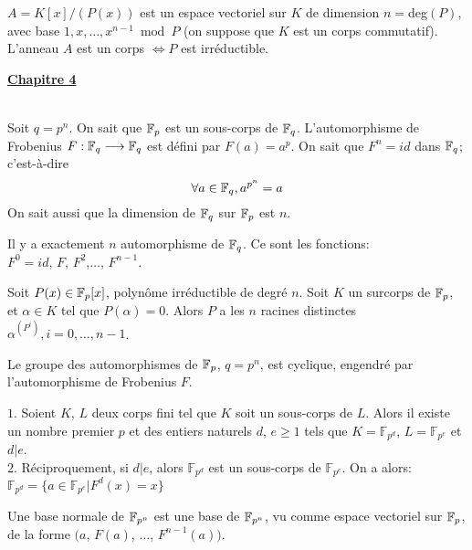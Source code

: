 \documentclass[12pt,a4paper]{article}
\begin{document}
\begin{flushleft}
\begin{prop}
$A = K[x] / (P(x))$ est un espace vectoriel sur $K$ de dimension $n = $deg$(P)$, avec base $1, x, \ldots , x^{n-1} \bmod P$ (on suppose que $K$ est un corps commutatif). L'anneau $A$ est un corps $\Leftrightarrow P$ est irréductible.
\end{prop}

\textbf{\underline{Chapitre 4}}\\~\\

\begin{rem}
Soit $q = p^n$. On sait que $\mathbb{F}_p$ est un sous-corps de $\mathbb{F}_q$. L'automorphisme de Frobenius $F: \mathbb{F}_q \longrightarrow \mathbb{F}_q$ est défini par $F(a) = a^p$. On sait que $F^n = id$ dans $\mathbb{F}_q$; c'est-à-dire $$\forall a \in \mathbb{F}_q , a^{p^n} = a$$ On sait aussi que la dimension de $\mathbb{F}_q$ sur $\mathbb{F}_p$ est $n$. 
\end{rem}

\begin{thm}
Il y a exactement $n$ automorphisme de $\mathbb{F}_q$. Ce sont les fonctions:\\ $F^0 = id$, $F$, $F^2$,$ \ldots $, $F^{n-1}$.
\end{thm}

\begin{thm}
Soit $P(x) \in \mathbb{F}_p [x]$, polynôme irréductible de degré $n$. Soit $K$ un surcorps de $\mathbb{F}_p$, et $\alpha \in K$ tel que $P(\alpha) = 0$. Alors $P$ a les $n$ racines distinctes $\alpha^{(P^i)}, i = 0, \ldots , n-1$.
\end{thm}

\begin{cor}
Le groupe des automorphismes de $\mathbb{F}_p$, $q = p^n$, est cyclique, engendré par l'automorphisme de Frobenius $F$.
\end{cor}

\begin{thm}
$1.$ Soient $K$, $L$ deux corps fini tel que $K$ soit un sous-corps  de $L$. Alors il existe un nombre premier $p$ et des entiers naturels $d$, $e \geq 1$ tels que $K = \mathbb{F}_{p^d}$, $L = \mathbb{F}_{p^e}$ et $d | e$.\\
$2.$ Réciproquement, si $d | e$, alors $\mathbb{F}_{p^d}$ est un sous-corps de $\mathbb{F}_{p^e}$. On a alors: $\mathbb{F}_{p^d} = \{ a \in \mathbb{F}_{p^e} | F^d (x) = x \}$
\end{thm}

\begin{mydef}
Une base normale de $\mathbb{F}_{p^n}$ est une base de $\mathbb{F}_{p^n}$, vu comme espace vectoriel sur $\mathbb{F}_p$, de la forme $(a$, $F(a)$, $\ldots$, $F^{n-1} (a) )$.
\end{mydef}


\end{flushleft}
\end{document}
